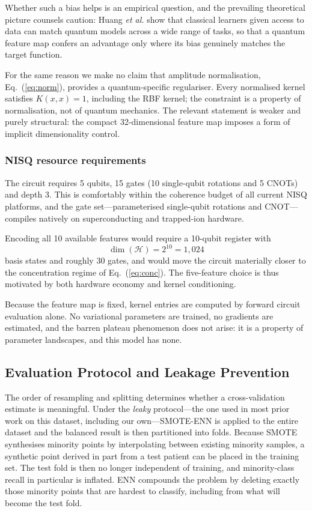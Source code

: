 \documentclass{ws-ijqi}
\begin{document}
Whether such a bias helps is an empirical question, and the prevailing
theoretical picture counsels caution: Huang \textit{et al.}\cite{huang2021}
show that classical learners given access to data can match quantum models
across a wide range of tasks, so that a quantum feature map confers an
advantage only where its bias genuinely matches the target function.

For the same reason we make no claim that amplitude normalisation,
Eq.~(\ref{eq:norm}), provides a quantum-specific regulariser. Every normalised
kernel satisfies $K(x,x)=1$, including the RBF kernel; the constraint is a
property of normalisation, not of quantum mechanics. The relevant statement is
weaker and purely structural: the compact 32-dimensional feature map imposes a
form of implicit dimensionality control.

\subsubsection{NISQ resource requirements}
\label{sec:nisq}

The circuit requires 5 qubits, 15 gates (10 single-qubit rotations and 5 CNOTs)
and depth 3. This is comfortably within the coherence budget of all current
NISQ platforms, and the gate set---parameterised single-qubit rotations and
CNOT---compiles natively on superconducting and trapped-ion hardware.

Encoding all 10 available features would require a 10-qubit register with
\begin{equation}
\dim(\mathcal{H}) = 2^{10} = 1{,}024
\label{eq:dim1024}
\end{equation}
basis states and roughly 30 gates, and would move the circuit materially closer
to the concentration regime of Eq.~(\ref{eq:conc}). The five-feature choice is
thus motivated by both hardware economy and kernel conditioning.

Because the feature map is fixed, kernel entries are computed by forward
circuit evaluation alone. No variational parameters are trained, no
gradients are estimated, and the barren plateau phenomenon\cite{mcclean2018}
does not arise: it is a property of parameter landscapes, and this model has
none.

\subsection{Evaluation Protocol and Leakage Prevention}
\label{sec:protocol}

The order of resampling and splitting determines whether a cross-validation
estimate is meaningful. Under the \emph{leaky} protocol---the one used in most
prior work on this dataset, including our own\cite{shinde2024}---SMOTE-ENN is
applied to the entire dataset and the balanced result is then partitioned into
folds. Because SMOTE synthesises minority points by interpolating between
existing minority samples, a synthetic point derived in part from a test
patient can be placed in the training set. The test fold is then no longer
independent of training, and minority-class recall in particular is inflated.
ENN compounds the problem by deleting exactly those minority points that are
hardest to classify, including from what will become the test fold.
\end{document}
